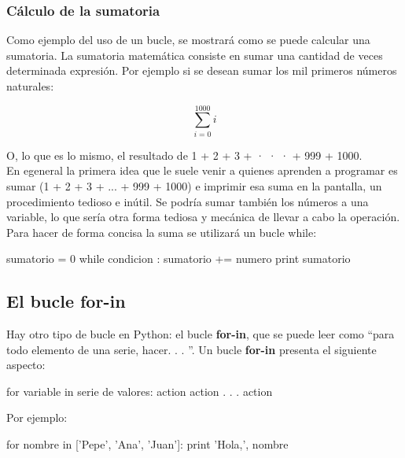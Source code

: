 \subsubsection{Cálculo de la sumatoria}

Como ejemplo del uso de un bucle, se mostrará como se puede calcular una sumatoria. La sumatoria matemática consiste en sumar una cantidad de veces determinada expresión. Por ejemplo si se desean sumar los mil primeros números naturales:

$$ \sum_{i=0}^{1000} i$$

O, lo que es lo mismo, el resultado de 1 + 2 + 3 + · · · + 999 + 1000.\\

En egeneral la primera idea que le suele venir a quienes aprenden a programar es sumar (1 + 2 + 3 + ... + 999 + 1000) e imprimir esa suma en la pantalla, un procedimiento tedioso e inútil. Se podría sumar también los números a una variable, lo que sería otra forma tediosa y mecánica de llevar a cabo la operación.\\

Para hacer de forma concisa la suma se utilizará un bucle while:\\

\begin{pyglist} [language=python]
sumatorio = 0
while condicion :
    sumatorio += numero
print sumatorio
\end{pyglist}


\subsection{El bucle for-in}

Hay otro tipo de bucle en Python: el bucle \textbf{for-in}, que se puede leer como ``para todo elemento de una serie, hacer. . . ''. Un bucle \textbf{for-in} presenta el siguiente aspecto:\\

\begin{pyglist} [language=python]
for variable in serie de valores:
    action
    action
    .
    .
    .
    action
\end{pyglist}

Por ejemplo:\\

\begin{pyglist} [language=python]
for nombre in ['Pepe', 'Ana', 'Juan']:
    print 'Hola,', nombre
\end{pyglist}


